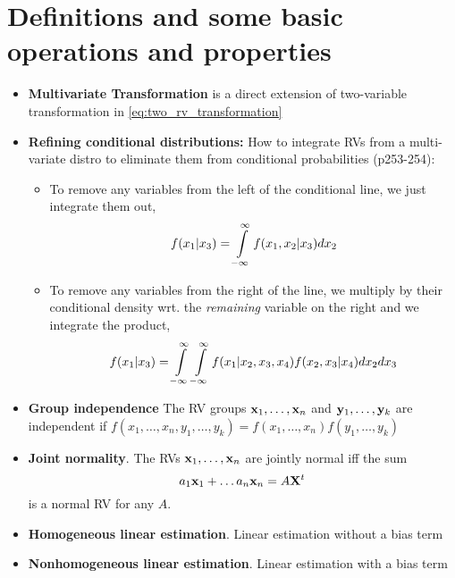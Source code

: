 \documentclass[a4paper, oneside]{book}
\begin{document}
\section{Definitions and some basic operations and properties}
\begin{itemize}
\item \textbf{Multivariate Transformation} is a direct extension of two-variable transformation in \eqref{eq:two_rv_transformation}
\item \textbf{Refining conditional distributions:} How to integrate RVs from a multi-variate distro to eliminate them from conditional probabilities (p253-254):
	\begin{itemize}
	\item To remove any variables from the left of the conditional line, we just integrate them out, \eg
	$$f(x_1|x_3) = \int\limits_{-\infty}^\infty f(x_1, x_2 | x_3) dx_2$$
	\item To remove any variables from the right of the line, we multiply by their conditional density wrt. the \textit{remaining} variable on the right and we integrate the product, \eg
	$$f(x_1 | x_3) = \int\limits_{-\infty}^\infty \int\limits_{-\infty}^\infty f(x_1|x_2,x_3,x_4) f(x_2,x_3 | x_4) d x_2 dx_3$$
	\end{itemize}
\item \textbf{Group independence} The RV groups $\mathbf x_1, \hdots, \mathbf x_n$ and $\mathbf y_1, \hdots, \mathbf y_k$ are independent if $f(x_1,\hdots,x_n, y_1,\hdots,y_k) = f(x_1,\hdots,x_n)f(y_1,\hdots,y_k)$  
\item \textbf{Joint normality}. The RVs $\mathbf x_1, \hdots, \mathbf x_n$ are jointly normal iff the sum%
 $$a_1 \mathbf x_1 + \hdots a_n \mathbf x_n = A\mathbf X^t$$%
 is a normal RV for any $A$.
 \item \textbf{Homogeneous linear estimation}. Linear estimation without a bias term
\item \textbf{Nonhomogeneous linear estimation}. Linear estimation with a bias term

 
\end{itemize}
\end{document}
